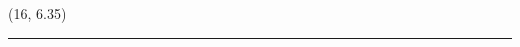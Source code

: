 \documentclass[a0]{a0poster}
\begin{document}
\begin{textblock}{7}(16, 6.35)
\sf


\vspace*{4mm} %
\bigskip
\hrule
\end{textblock}







\end{document}
